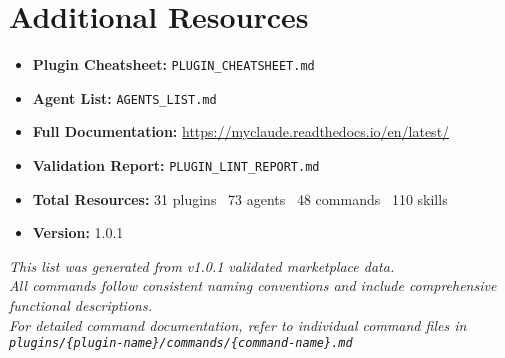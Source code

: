 \documentclass[11pt,a4paper]{article}
\begin{document}
\section{Additional Resources}

\begin{itemize}
    \item \textbf{Plugin Cheatsheet:} \texttt{PLUGIN\_CHEATSHEET.md}
    \item \textbf{Agent List:} \texttt{AGENTS\_LIST.md}
    \item \textbf{Full Documentation:} \url{https://myclaude.readthedocs.io/en/latest/}
    \item \textbf{Validation Report:} \texttt{PLUGIN\_LINT\_REPORT.md}
    \item \textbf{Total Resources:} 31 plugins \textbar\ 73 agents \textbar\ 48 commands \textbar\ 110 skills
    \item \textbf{Version:} 1.0.1
\end{itemize}

\vfill

\begin{center}
\small\color{secondarycolor}
\textit{This list was generated from v1.0.1 validated marketplace data.\\
All commands follow consistent naming conventions and include comprehensive functional descriptions.\\
For detailed command documentation, refer to individual command files in\\
\texttt{plugins/\{plugin-name\}/commands/\{command-name\}.md}}
\end{center}
\end{document}

